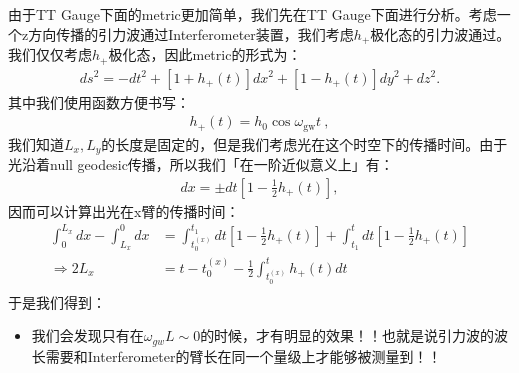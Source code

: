 由于TT Gauge下面的metric更加简单，我们先在TT Gauge下面进行分析。考虑一个z方向传播的引力波通过Interferometer装置，我们考虑$ h_+ $极化态的引力波通过。我们仅仅考虑$ h_+ $极化态，因此metric的形式为：
\begin{align}
  ds^2=-dt^2+[1+h_+(t)]dx^2+[1-h_+(t)]dy^2+dz^2.
\end{align}
其中我们使用函数方便书写：
\begin{align}
  h_+(t)=h_0\cos\omega_\mathrm{gw}t\mathrm{~,}
\end{align}
我们知道$ L_x,L_y $的长度是固定的，但是我们考虑光在这个时空下的传播时间。由于光沿着null geodesic传播，所以我们「在一阶近似意义上」有：
\begin{align}
  dx=\pm dt\left[1-\frac{1}{2}h_+(t)\right],
\end{align}
因而可以计算出光在x臂的传播时间：
\begin{align}
  \int_0^{L_x}dx - \int_{L_x}^{0}dx &= \int_{t_0^{(x)}}^{t_1} dt\left[1-\frac{1}{2}h_+(t)\right] + \int_{t_1}^{t} dt\left[1-\frac{1}{2}h_+(t)\right] \\ 
  \Rightarrow 2L_x &= t- t_0^{(x)} - \frac{1}{2}\int_{t_0^{(x)}}^{t} h_+(t) dt \\
\end{align}
于是我们得到：
\begin{itemize}
  \item 我们会发现只有在$ \omega_{gw}L \sim 0 $的时候，才有明显的效果！！也就是说引力波的波长需要和Interferometer的臂长在同一个量级上才能够被测量到！！
\end{itemize}

\bigskip
{}

